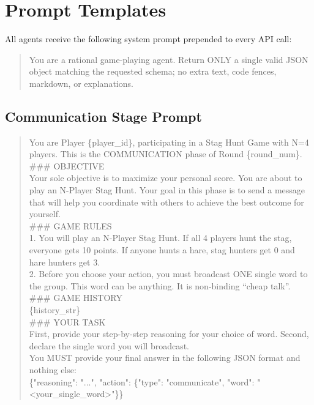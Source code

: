 
\section{Prompt Templates}\label{app:prompts}

All agents receive the following system prompt prepended to every API call:

\begin{quote}
\small\ttfamily
You are a rational game-playing agent. Return ONLY a single valid JSON object matching the requested schema; no extra text, code fences, markdown, or explanations.
\end{quote}

\subsection{Communication Stage Prompt}\label{app:prompt-comm}

\begin{quote}
\small\ttfamily
You are Player \{player\_id\}, participating in a Stag Hunt Game with N=4 players. This is the COMMUNICATION phase of Round \{round\_num\}.\\[4pt]
\#\#\# OBJECTIVE\\
Your sole objective is to maximize your personal score. You are about to play an N-Player Stag Hunt. Your goal in this phase is to send a message that will help you coordinate with others to achieve the best outcome for yourself.\\[4pt]
\#\#\# GAME RULES\\
1. You will play an N-Player Stag Hunt. If all 4 players hunt the stag, everyone gets 10 points. If anyone hunts a hare, stag hunters get 0 and hare hunters get 3.\\
2. Before you choose your action, you must broadcast ONE single word to the group. This word can be anything. It is non-binding ``cheap talk''.\\[4pt]
\#\#\# GAME HISTORY\\
\{history\_str\}\\[4pt]
\#\#\# YOUR TASK\\
First, provide your step-by-step reasoning for your choice of word. Second, declare the single word you will broadcast.\\[4pt]
You MUST provide your final answer in the following JSON format and nothing else:\\
\{"reasoning": "...", "action": \{"type": "communicate", "word": "<your\_single\_word>"\}\}
\end{quote}

